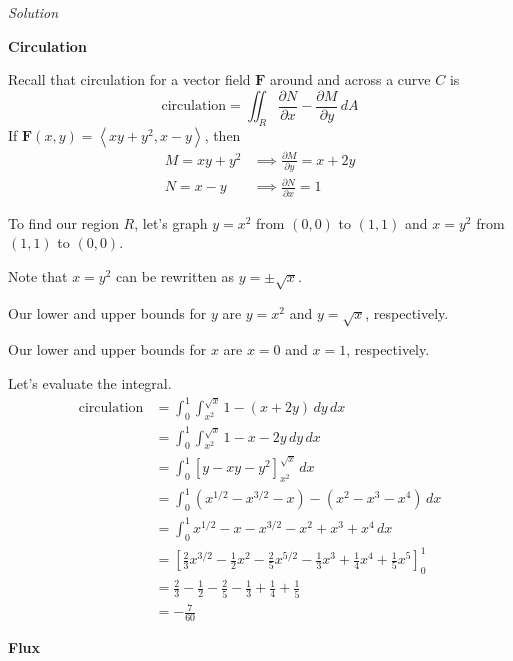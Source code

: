 \documentclass{article}
\newcommand{\lrp}[1]{\left( #1 \right)}
\newcommand{\lra}[1]{\left\langle #1 \right\rangle}
\newcommand{\lrb}[1]{\left[ #1 \right]}
\newcommand{\F}[0]{\mathbf{F}}
\newcommand{\Solution}{\textit{Solution}}
\begin{document}
\Solution

{}\textbf{Circulation}

Recall that circulation for a vector field $\F$ around and across a curve $C$ is
\begin{equation*}
    \text{circulation}= \iint_R \frac{\partial N}{\partial x} - \frac{\partial M}{\partial y}\,dA
\end{equation*}
If $\F(x,y)=\lra{xy+y^2,x-y}$, then
\begin{align*}
    M=xy+y^2&\implies \frac{\partial M}{\partial y}=x+2y\\
    N=x-y&\implies \frac{\partial N}{\partial x}=1
\end{align*}

To find our region $R$, let's graph $y=x^2$ from $(0,0)$ to $(1,1)$ and $x=y^2$ from $(1,1)$ to $(0,0)$.
\begin{center}
\end{center}
Note that $x=y^2$ can be rewritten as $y=\pm \sqrt{x}$.

Our lower and upper bounds for $y$ are $y=x^2$ and $y=\sqrt{x}$, respectively.

Our lower and upper bounds for $x$ are $x=0$ and $x=1$, respectively.

Let's evaluate the integral.
\begin{align*}
    \text{circulation}&=\int_0^1\int_{x^2}^{\sqrt{x}}1-\lrp{x+2y}\,dy\,dx\\
    &=\int_0^1 \int_{x^2}^{\sqrt{x}}1-x-2y\,dy\,dx\\
    &=\int_0^1 \lrb{y-xy-y^2}_{x^2}^{\sqrt{x}}\,dx\\
    &=\int_0^1 \lrp{{x}^{1/2}-x^{3/2}-x}-\lrp{x^2-x^3-x^4}\,dx\\
    &=\int_0^1 x^{1/2}-x-x^{3/2}-x^2+x^3+x^4\,dx\\
    &=\lrb{\frac{2}{3}x^{3/2}-\frac{1}{2}x^2-\frac{2}{5}x^{5/2}-\frac{1}{3}x^3+\frac{1}{4}x^4+\frac{1}{5}x^5}_0^1\\
    &=\frac{2}{3}-\frac{1}{2}-\frac{2}{5}-\frac{1}{3}+\frac{1}{4}+\frac{1}{5}\\
    &=-\frac{7}{60}\tag{use a calculator}
\end{align*}
\newpage
{}
{}\textbf{Flux}
\end{document}

